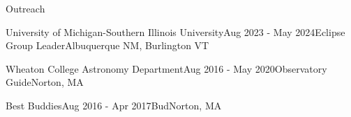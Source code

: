 \documentclass{resume} %
\begin{document}
\begin{rSection}{Outreach}

\begin{rSubsection}{University of Michigan-Southern Illinois University}{Aug 2023 - May 2024}{Eclipse Group Leader}{Albuquerque NM, Burlington VT}
\end{rSubsection}

\begin{rSubsection}{Wheaton College Astronomy Department}{Aug 2016 - May 2020}{Observatory Guide}{Norton, MA}

\end{rSubsection}

\begin{rSubsection}{Best Buddies}{Aug 2016 - Apr 2017}{Bud}{Norton, MA}
\end{rSubsection}

\end{rSection}
\end{document}
